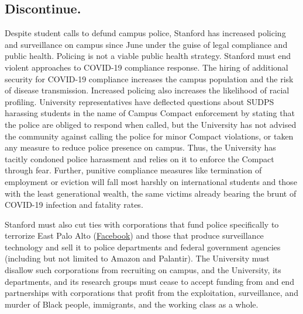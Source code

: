 \documentclass[12pt, titlepage, letterpaper]{article}
\begin{document}
\subsection*{Discontinue.}
%
Despite student calls to defund campus police, Stanford has increased policing and surveillance on campus since June under the guise of legal compliance and public health. Policing is not a viable public health strategy. Stanford must end violent approaches to COVID-19 compliance response. The hiring of additional security for COVID-19 compliance increases the campus population and the risk of disease transmission. Increased policing also increases the likelihood of racial profiling. University representatives have deflected questions about SUDPS harassing students in the name of Campus Compact enforcement by stating that the police are obliged to respond when called, but the University has not advised the community against calling the police for minor Compact violations, or taken any measure to reduce police presence on campus. Thus, the University has tacitly condoned police harassment and relies on it to enforce the Compact through fear. Further, punitive compliance measures like termination of employment or eviction will fall most harshly on international students and those with the least generational wealth, the same victims already bearing the brunt of COVID-19 infection and fatality rates. 

Stanford must also cut ties with corporations that fund police specifically to terrorize East Palo Alto (\href{https://www.vice.com/en_us/article/d3akm7/how-facebook-bought-a-police-force}{Facebook}) and those that produce surveillance technology and sell it to police departments and federal government agencies (including but not limited to Amazon and Palantir). The University must disallow such corporations from recruiting on campus, and the University, its departments, and its research groups must cease to accept funding from and end partnerships with corporations that profit from the exploitation, surveillance, and murder of Black people, immigrants, and the working class as a whole. 
\end{document}
